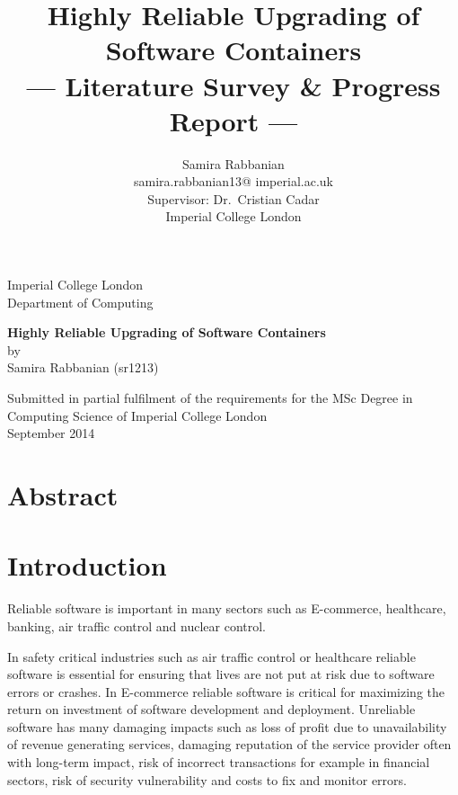 \documentclass[a4paper,11pt,twoside]{article}
\title{Highly Reliable Upgrading of Software Containers\\\Large{--- Literature Survey \& Progress Report ---}}
\author{Samira Rabbanian\\
  samira.rabbanian13@ imperial.ac.uk \\
  \small{Supervisor: Dr.\ Cristian Cadar}\\
  \small{Imperial College London}}
\begin{document}
\maketitle


\begin{titlepage}
    \begin{center}
        \vspace*{2cm}
        
        \large
        {Imperial College London}\\
        \large
         \vspace*{0.2cm}
        {Department of Computing}
        
        \vspace{4.5 cm}
        \large
        {\Large \textbf{Highly Reliable Upgrading of Software Containers}}\\
        \vspace{1.0 cm}
        {by}\\
        {Samira Rabbanian (sr1213)}
        
        \vspace{10cm}
        

  	\large {Submitted in partial fulfilment of the requirements for the MSc Degree in Computing Science of Imperial College London }\\
  	
\vspace*{1 cm}  	
  \large{September 2014}\\ 
           
    \end{center}
\end{titlepage}

\tableofcontents
\clearpage
\section{Abstract}

\clearpage
\section{Introduction}

Reliable software is important in many sectors such as E-commerce, healthcare, banking, air traffic control and nuclear control.

In safety critical industries such as air traffic control or healthcare reliable software is essential for ensuring that lives are not put at risk due to software errors or crashes. In E-commerce reliable software is critical for maximizing the return on investment of software development and deployment. Unreliable software has many damaging impacts such as loss of profit due to unavailability of revenue generating services, damaging reputation of the service provider often with long-term impact, risk of incorrect transactions for example in financial sectors, risk of security vulnerability and costs to fix and monitor errors.
\end{document}
